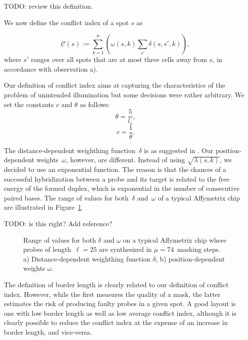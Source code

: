 \documentclass{bioinfo}
\begin{document}
TODO: review this definition.

We now define the conflict index of a spot $s$ as

\begin{equation}
\label{eq:conf_idx}
\mathcal{C}(s) := \sum_{k=1}^{\mu} \left( \omega(s,k) \sum_{s'} \delta(s,s',k) \right),
\end{equation}
where $s'$ ranges over all spots that are at most three cells away from $s$, in accordance with observation a).

Our definition of conflict index aims at capturing the characteristics of the problem of unintended illumination but some decisions were rather arbitrary. We set the constants $c$ and $\theta$ as follows:
\begin{displaymath}
\theta = \frac{5}{l_s},
\end{displaymath}
\begin{displaymath}
c = \frac{1}{\theta}.
\end{displaymath}

The distance-dependent weighthing function~$\delta$ is as suggested in \citealp{KAHNG03_1}. Our position-dependent weights~$\omega$, however, are different. Instead of using $\sqrt{\lambda(s,k)}$, we decided to use an exponential function. The reason is that the chances of a successful hybridization between a probe and its target is related to the free energy of the formed duplex, which is exponential in the number of consecutive paired bases. The range of values for both~$\delta$ and~$\omega$ of a typical Affymetrix chip are illustrated in Figure~\ref{fig:conflit_index_values}.

TODO: is this right? Add reference?

\begin{figure}
\caption{Range of values for both $\delta$ and $\omega$ on a typical Affymetrix chip where probes of length~$\ell = 25$ are synthesized in $\mu = 74$~masking steps. a) Distance-dependent weighthing function $\delta$; b) position-dependent weights $\omega$.}
\label{fig:conflit_index_values}
\end{figure}

The definition of border length is clearly related to our definition of conflict index. However, while the first measures the quality of a mask, the latter estimates the risk of producing faulty probes in a given spot. A good layout is one with low border length as well as low average conflict index, although it is clearly possible to reduce the conflict index at the expense of an increase in border length, and vice-versa.
\end{document}
